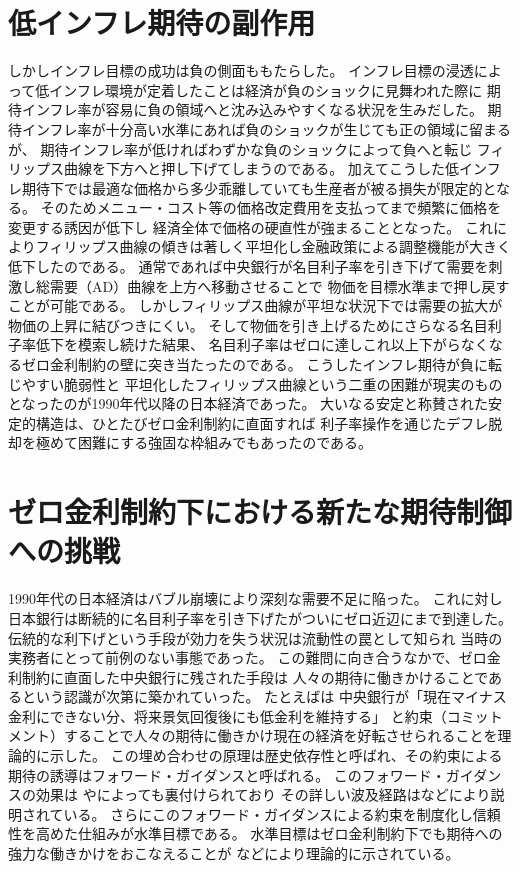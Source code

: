 \section{低インフレ期待の副作用}
\label{sec:review_side_effects_of_low_inflation}

しかしインフレ目標の成功は負の側面ももたらした。
インフレ目標の浸透によって低インフレ環境が定着したことは経済が負のショックに見舞われた際に
期待インフレ率が容易に負の領域へと沈み込みやすくなる状況を生みだした。
期待インフレ率が十分高い水準にあれば負のショックが生じても正の領域に留まるが、
期待インフレ率が低ければわずかな負のショックによって負へと転じ
フィリップス曲線を下方へと押し下げてしまうのである。
加えてこうした低インフレ期待下では最適な価格から多少乖離していても生産者が被る損失が限定的となる。
そのためメニュー・コスト等の価格改定費用を支払ってまで頻繁に価格を変更する誘因が低下し
経済全体で価格の硬直性が強まることとなった。
これによりフィリップス曲線の傾きは著しく平坦化し金融政策による調整機能が大きく低下したのである。
通常であれば中央銀行が名目利子率を引き下げて需要を刺激し総需要（AD）曲線を上方へ移動させることで
物価を目標水準まで押し戻すことが可能である。
しかしフィリップス曲線が平坦な状況下では需要の拡大が物価の上昇に結びつきにくい。
そして物価を引き上げるためにさらなる名目利子率低下を模索し続けた結果、
名目利子率はゼロに達しこれ以上下がらなくなるゼロ金利制約の壁に突き当たったのである。
こうしたインフレ期待が負に転じやすい脆弱性と
平坦化したフィリップス曲線という二重の困難が現実のものとなったのが1990年代以降の日本経済であった。
大いなる安定と称賛された安定的構造は、ひとたびゼロ金利制約に直面すれば
利子率操作を通じたデフレ脱却を極めて困難にする強固な枠組みでもあったのである。

\section{ゼロ金利制約下における新たな期待制御への挑戦}
\label{sec:review_zlb_challenge}



1990年代の日本経済はバブル崩壊により深刻な需要不足に陥った。
これに対し日本銀行は断続的に名目利子率を引き下げたがついにゼロ近辺にまで到達した。
伝統的な利下げという手段が効力を失う状況は流動性の罠として知られ
当時の実務者にとって前例のない事態であった。
この難問に向き合うなかで、ゼロ金利制約に直面した中央銀行に残された手段は
人々の期待に働きかけることであるという認識が次第に築かれていった。
たとえば\textcite{EggertssonWoodford2003}は
中央銀行が「現在マイナス金利にできない分、将来景気回復後にも低金利を維持する」
と約束（コミットメント）することで人々の期待に働きかけ現在の経済を好転させられることを理論的に示した。
この埋め合わせの原理は歴史依存性と呼ばれ、その約束による期待の誘導はフォワード・ガイダンスと呼ばれる。
このフォワード・ガイダンスの効果は
 \textcite{ReifschneiderWilliams2000}や\textcite{JungTeranishiWatanabe2005}によっても裏付けられており
その詳しい波及経路は\textcite{ReifschneiderWilliams2000}などにより説明されている。
さらにこのフォワード・ガイダンスによる約束を制度化し信頼性を高めた仕組みが水準目標である。
水準目標はゼロ金利制約下でも期待への強力な働きかけをおこなえることが
\textcite{Woodford2012}などにより理論的に示されている。

